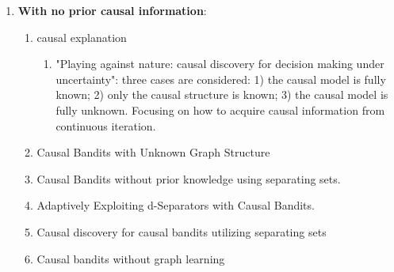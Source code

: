 \begin{enumerate}
    \item \textbf{With no prior causal information}: 
    \begin{enumerate}
    \item causal explanation
    \begin{enumerate}
        \item "Playing against nature: causal discovery for decision making under uncertainty": three cases are considered: 1) the causal model is fully known; 2) only the causal structure is known; 3) the causal model is fully unknown. Focusing on how to acquire causal information from continuous iteration. 

    \end{enumerate}
    \item Causal Bandits with Unknown Graph Structure
    \item Causal Bandits without prior knowledge using separating sets.
    \item Adaptively Exploiting d-Separators with Causal Bandits.
    \item Causal discovery for causal bandits utilizing separating sets
    \item Causal bandits without graph learning
    \end{enumerate}
\end{enumerate}


